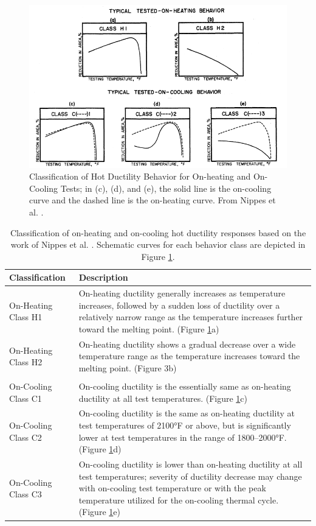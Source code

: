\begin{figure}[h]
\centering
\includegraphics[width=6.5in]{figures/nippes-criteria.png}
\caption{Classification of Hot Ductility Behavior for On-heating and On-Cooling Tests; in (c), (d), and (e), the solid line is the on-cooling curve and the dashed line is the on-heating curve.  From Nippes et al. \cite[Fig.~66]{nippes_further_1957}.}
\label{fig:nippes-criteria}
\end{figure}

\begin{table}[h]
\caption{Classification of on-heating and on-cooling hot ductility responses based on the work of Nippes et al. \cite{nippes_further_1957}. Schematic curves for each behavior class are depicted in Figure \ref{fig:nippes-criteria}.}
\begin{tabular}{ lp{4in} }
\toprule
\textbf{Classification} & \textbf{Description} \\
\midrule
On-Heating Class H1 & On-heating ductility generally increases as temperature increases, followed by a sudden loss of ductility over a relatively narrow range as the temperature increases further toward the melting point. (Figure \ref{fig:nippes-criteria}a) \\
On-Heating Class H2 & On-heating ductility shows a gradual decrease over a wide temperature range as the temperature increases toward the melting point. (Figure 3b) \\
& \\
On-Cooling Class C1 & On-cooling ductility is the essentially same as on-heating ductility at all test temperatures. (Figure \ref{fig:nippes-criteria}c) \\
On-Cooling Class C2 & On-cooling ductility is the same as on-heating ductility at test temperatures of 2100°F or above, but is significantly lower at test temperatures in the range of 1800--2000°F. (Figure \ref{fig:nippes-criteria}d) \\
On-Cooling Class C3 & On-cooling ductility is lower than on-heating ductility at all test temperatures; severity of ductility decrease may change with on-cooling test temperature or with the peak temperature utilized for the on-cooling thermal cycle. (Figure \ref{fig:nippes-criteria}e) \\
\bottomrule
\end{tabular}
\label{tab:nippes-classification}
\end{table}


